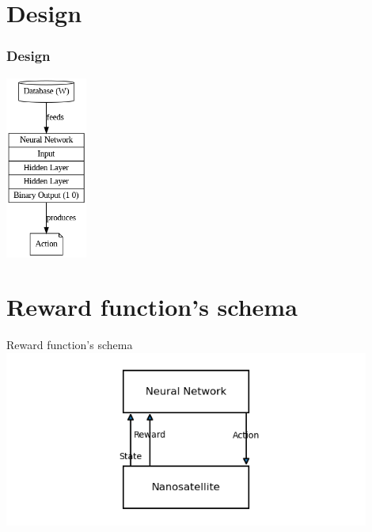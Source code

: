 \documentclass[10pt]{beamer}
\begin{document}
\section{Design}
\begin{frame}
  \frametitle{Design}
  \centering
  \href{https://github.com/EnigmaK9/linx/tree/main/06-progress_04_22_2024/padilla-villanueva/sql}{\includegraphics[width=0.2\textwidth]{descarga.png}}
\end{frame}



\section{Reward function's schema}
\begin{frame}{Reward function's schema}
  \href{https://colab.research.google.com/drive/1hqRPRc5jw_YP3mABA8Y5R_F7r0MRvMcT?usp=sharing}{\includegraphics[width=0.9\textwidth]{reward.png}}

\end{frame}
\end{document}
